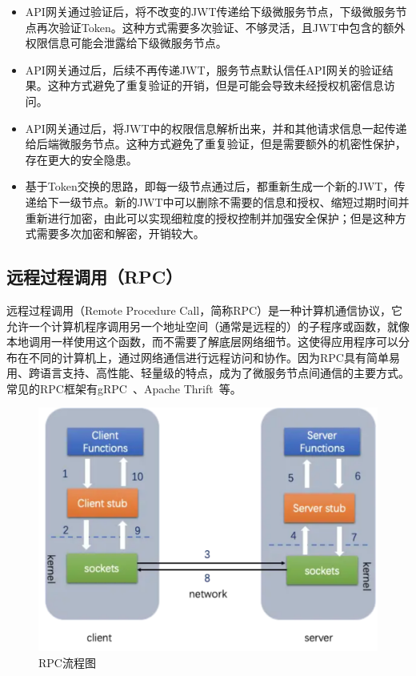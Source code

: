 \begin{itemize}
    \item API网关通过验证后，将不改变的JWT传递给下级微服务节点，下级微服务节点再次验证Token。这种方式需要多次验证、不够灵活，且JWT中包含的额外权限信息可能会泄露给下级微服务节点。
    \item API网关通过后，后续不再传递JWT，服务节点默认信任API网关的验证结果。这种方式避免了重复验证的开销，但是可能会导致未经授权机密信息访问。
    \item API网关通过后，将JWT中的权限信息解析出来，并和其他请求信息一起传递给后端微服务节点。这种方式避免了重复验证，但是需要额外的机密性保护，存在更大的安全隐患。
    \item 基于Token交换的思路，即每一级节点通过后，都重新生成一个新的JWT，传递给下一级节点。新的JWT中可以删除不需要的信息和授权、缩短过期时间并重新进行加密，由此可以实现细粒度的授权控制并加强安全保护；但是这种方式需要多次加密和解密，开销较大。
\end{itemize}

\subsection{远程过程调用（RPC）}

远程过程调用（Remote Procedure Call，简称RPC）是一种计算机通信协议，它允许一个计算机程序调用另一个地址空间（通常是远程的）的子程序或函数，就像本地调用一样使用这个函数，而不需要了解底层网络细节。这使得应用程序可以分布在不同的计算机上，通过网络通信进行远程访问和协作。因为RPC具有简单易用、跨语言支持、高性能、轻量级的特点，成为了微服务节点间通信的主要方式。常见的RPC框架有gRPC~\cite{grpc}、Apache Thrift~\cite{Thrift}等。

\begin{figure}[!ht]
    \centering
    \includegraphics[width=.7\textwidth]{figures/RPC.svg}
    \caption{RPC流程图}
    \label{fig:rpc}
\end{figure}

